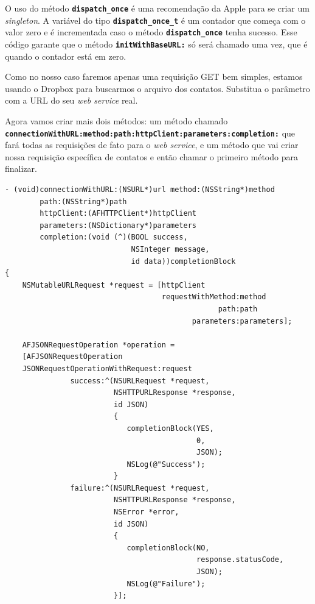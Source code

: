 \documentclass[a4paper,12pt,brazil,doubleside]{book}
\begin{document}
\begin{singlespace}
O uso do método \texttt{\textbf{dispatch\_once}} é uma recomendação da Apple para se criar um \emph{singleton}. A variável do tipo \texttt{\textbf{dispatch\_once\_t}} é um contador que começa com o valor zero e é incrementada caso o método \texttt{\textbf{dispatch\_once}} tenha sucesso. Esse código garante que o método \texttt{\textbf{initWithBaseURL:}} só será chamado uma vez, que é quando o contador está em zero.

Como no nosso caso faremos apenas uma requisição GET bem simples, estamos usando o Dropbox para buscarmos o arquivo dos contatos. Substitua o parâmetro com a URL do seu \emph{web service} real.

Agora vamos criar mais dois métodos: um método chamado \\ \texttt{\textbf{connectionWithURL:method:path:httpClient:parameters:completion:}} que fará todas as requisições de fato para o \emph{web service}, e um método que vai criar nossa requisição específica de contatos e então chamar o primeiro método para finalizar.

\begin{listing}[H]
\begin{verbatim}
- (void)connectionWithURL:(NSURL*)url method:(NSString*)method
        path:(NSString*)path
        httpClient:(AFHTTPClient*)httpClient
        parameters:(NSDictionary*)parameters
        completion:(void (^)(BOOL success,
                             NSInteger message,
                             id data))completionBlock
{
    NSMutableURLRequest *request = [httpClient
                                    requestWithMethod:method
                                                 path:path
                                           parameters:parameters];
    
    AFJSONRequestOperation *operation =
    [AFJSONRequestOperation
	JSONRequestOperationWithRequest:request
               success:^(NSURLRequest *request,
                         NSHTTPURLResponse *response,
                         id JSON)
                         {
                         	completionBlock(YES,
                         	                0,
                         	                JSON);
                         	NSLog(@"Success");
                         }
               failure:^(NSURLRequest *request,
                         NSHTTPURLResponse *response,
                         NSError *error,
                         id JSON)
                         {
                         	completionBlock(NO,
                         	                response.statusCode,
                         	                JSON);
                         	NSLog(@"Failure");
                         }];
                   

\end{verbatim}
\end{listing}
\end{singlespace}
\end{document}
